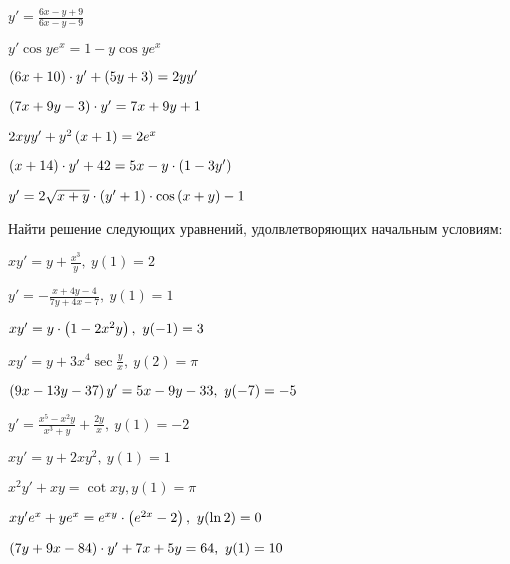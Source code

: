 \begin{multicols}{2}
\begin{enumtasks}
			\item \( y' = \frac{6x - y + 9}{6x - y - 9} \)											%
			\item \( y' \cos{ye^{x}} = 1 - y \cos{ye^{x}} \)										%
			\item \( \left( 6x + 10 \right) \cdot y' + \left( 5y + 3 \right) = 2yy' \)							%
			\item \( \left( 7x + 9y - 3 \right) \cdot y' = 7x + 9y + 1 \) 									%
 			\item \( 2xyy' + y^2 \left( x + 1 \right) = 2e^x \)											%
			\item \( \left( x + 14 \right) \cdot y' + 42 = 5x - y \cdot \left( 1 - 3y' \right) \)					%
			\item \( y' = 2\sqrt{x + y} \cdot \left( y' + 1 \right) \cdot \cos{ \left( x + y \right) } - 1 \)		%
		
		\end{enumtasks}
	\end{multicols}

	Найти решение следующих уравнений, удолвлетворяющих начальным условиям:

	\begin{enumtasks}

		\label{firstorder:homogeneous_cauchy}
		\item \( xy' = y + \frac{x^3}{y}, ~ y(1) = 2 \)												%
		\item \( y' = - \frac{x + 4y - 4}{7y + 4x - 7}, ~ y(1) = 1 \)								%
		\item \( xy' = y \cdot \left( 1 - 2x^2 y \right), ~ y(-1) = 3 \) 									%
		\item \( xy' = y + 3x^4 \sec{\frac{y}{x}}, ~ y(2) = \pi \)									%
		\item \( \left( 9x - 13y - 37 \right) y' = 5x - 9y - 33, ~ y(-7) = -5 \)							%
		\item \( y' = \frac{x^5 - x^2 y}{x^3 + y} + \frac{2y}{x}, ~ y(1) = -2 \)					%
		\item \( xy' = y + 2xy^2, ~ y(1) = 1 \)														%
		\item \( x^2y' + xy = \cot{xy}, y(1) = \pi \) 												%
		\item \( xy' e^{x} + ye^{x} = e^{xy} \cdot \left( e^{2x} - 2 \right), ~ y(\ln{2}) = 0 \)			%
		\item \( \left( 7y + 9x - 84 \right) \cdot y' + 7x + 5y = 64, ~ y(1) = 10 \)						%

	\end{enumtasks}
